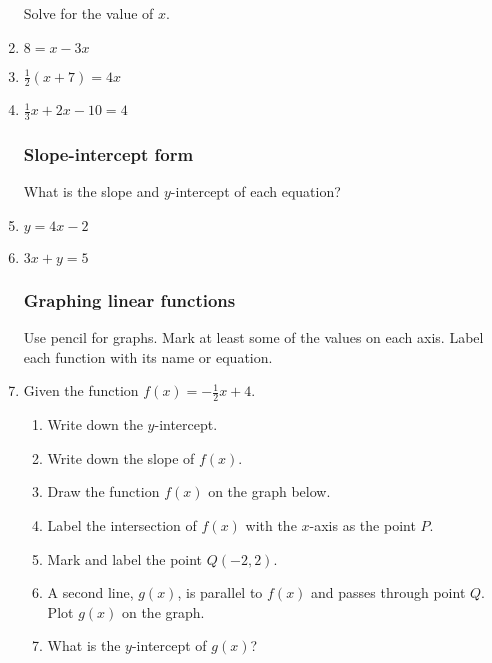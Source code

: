 \documentclass[12pt, oneside]{article}
\begin{document}
\begin{enumerate}
Solve for the value of $x$.
\item   $8=x-3x$ \vspace{3cm}
\item   $\frac{1}{2}(x+7)=4x$ \vspace{4cm}
\item   $\frac{1}{3}x+2x-10=4$ \vspace{4cm}

\subsubsection*{Slope-intercept form}

What is the slope and $y$-intercept of each equation?
\item   $y=4x-2$ \vspace{1.5cm}
\item   $3x+y=5$ \vspace{3cm}


\newpage
\subsubsection*{Graphing linear functions}
Use pencil for graphs. Mark at least some of the values on each axis. Label each function with its name or equation.
\item Given the function $f(x)=-\frac{1}{2}x+4$.
\begin{enumerate}
    \item Write down the $y$-intercept. \bigskip
    \item Write down the slope of $f(x)$. \bigskip
    \item Draw the function $f(x)$ on the graph below.
    \item Label the intersection of $f(x)$ with the $x$-axis as the point $P$.
    \item Mark and label the point $Q (-2, 2)$.
    \item A second line, $g(x)$, is parallel to $f(x)$ and passes through point $Q$. Plot $g(x)$ on the graph.
    \item What is the $y$-intercept of $g(x)$? \bigskip
\end{enumerate}

\begin{center} %
\end{center}


\end{enumerate}
\end{document}
